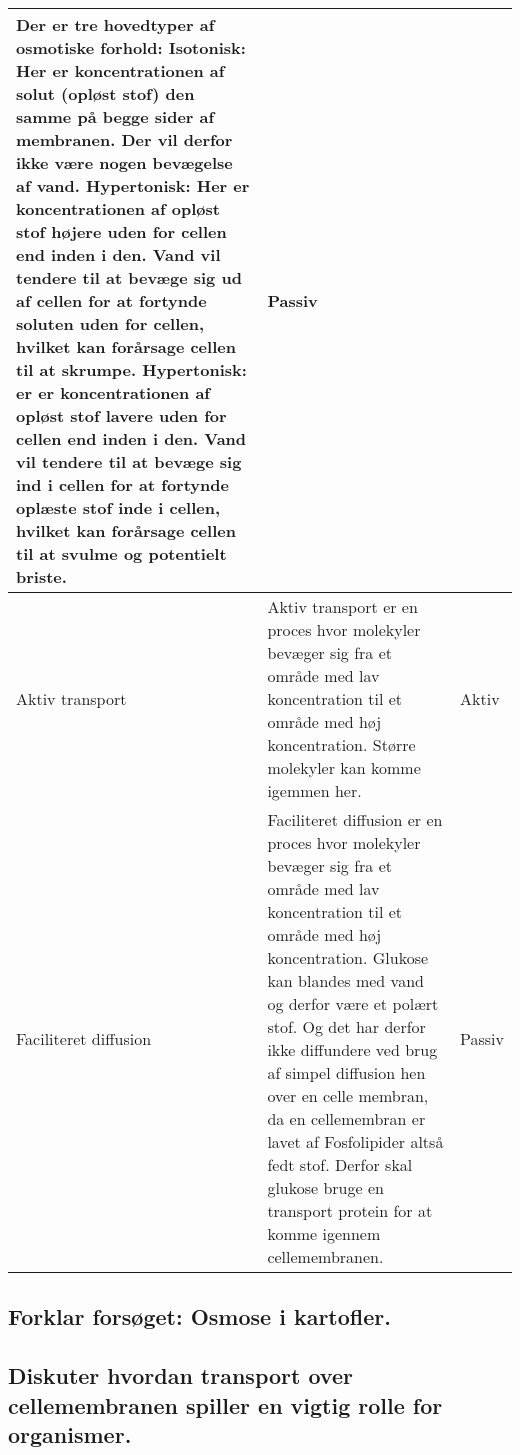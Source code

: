 \begin{center}
\begin{longtable}{ | m{2cm} | m{11cm}| m{2cm} |}
                Der er tre hovedtyper af osmotiske forhold:
                \textbf{Isotonisk: }  Her er koncentrationen af solut (opløst stof) den samme på begge sider af membranen. Der vil derfor ikke være nogen bevægelse af vand. 
                \textbf{Hypertonisk: } Her er koncentrationen af opløst stof højere uden for cellen end inden i den.
                Vand vil tendere til at bevæge sig ud af cellen for at fortynde soluten uden for cellen, hvilket kan forårsage cellen til at skrumpe.
                \textbf{Hypertonisk: } er er koncentrationen af opløst stof lavere uden for cellen end inden i den. Vand vil tendere til at bevæge sig ind i cellen for at fortynde oplæste stof inde i cellen, hvilket kan forårsage cellen til at svulme og potentielt briste. & Passiv\\
                \hline
                Aktiv transport & Aktiv transport er en proces hvor molekyler bevæger sig fra et område med lav koncentration til et område med høj koncentration. Større molekyler kan komme igemmen her. & Aktiv\\
                \hline
                Faciliteret diffusion & Faciliteret diffusion er en proces hvor molekyler bevæger sig fra et område med lav koncentration til et område med høj koncentration. Glukose kan blandes med vand og derfor være et polært stof. Og det har derfor ikke diffundere ved brug af simpel diffusion hen over en celle membran, da en cellemembran er lavet af Fosfolipider altså fedt stof. Derfor skal glukose bruge en transport protein for at komme igennem cellemembranen.  
                & Passiv\\
                \hline
            \end{longtable}
        \end{center}

    \subsection{Forklar forsøget: Osmose i kartofler.}
    \subsection{Diskuter hvordan transport over cellemembranen spiller en vigtig rolle for organismer.}
